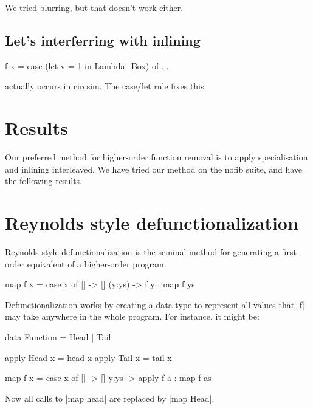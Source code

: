 \documentclass[preprint]{sigplanconf}
\begin{document}
We tried blurring, but that doesn't work either.

\subsection{Let's interferring with inlining}

\begin{code}
f x = case (let v = 1 in Lambda_Box) of ...
\end{code}

actually occurs in circsim. The case/let rule fixes this.



\section{Results}

Our preferred method for higher-order function removal is to apply specialisation and inlining interleaved. We have tried our method on the nofib suite, and have the following results.


\section{Reynolds style defunctionalization}

Reynolds style defunctionalization \cite{reynolds:defunc} is the seminal method for generating a first-order equivalent of a higher-order program.

\begin{example}
\begin{code}
map f x = case  x of
                []      -> []
                (y:ys)  -> f y : map f ys
\end{code}

\noindent Defunctionalization works by creating a data type to represent all values that |f| may take anywhere in the whole program. For instance, it might be:

\begin{code}
data Function = Head | Tail

apply Head  x = head  x
apply Tail  x = tail  x

map f x = case  x of
                []    -> []
                y:ys  -> apply f a : map f as
\end{code}

\noindent Now all calls to |map head| are replaced by |map Head|.
\end{example}
\end{document}
